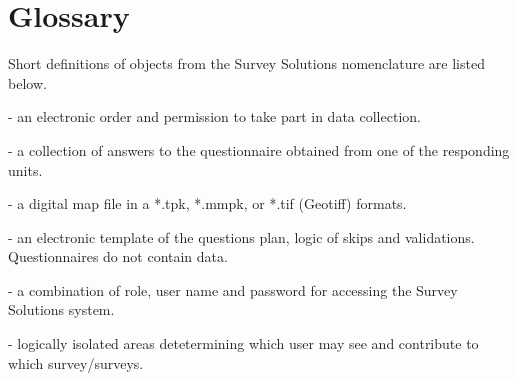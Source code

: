 \section{Glossary}
\vskip16pt
Short definitions of objects from the Survey Solutions nomenclature are listed below.\par
\vskip16pt

 - an electronic order and permission to take part in data collection.\par
{} - a collection of answers to the questionnaire obtained from one of the responding units.\par
{} - a digital map file in a *.tpk, *.mmpk, or *.tif (Geotiff) formats.\par
{} - an electronic template of the questions plan, logic of skips and validations. Questionnaires do not contain data.\par
{} - a combination of role, user name and password for accessing the Survey Solutions system.\par
{} - logically isolated areas detetermining which user may see and contribute to which survey/surveys.\par
